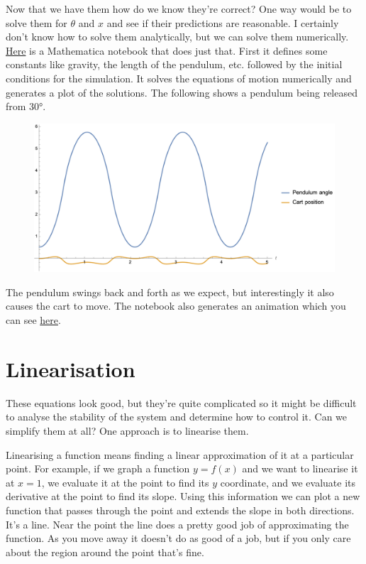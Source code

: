 \documentclass{article}
\begin{document}
Now that we have them how do we know they're correct? One way would be to solve them for $\theta$ and $x$ and see if their predictions are reasonable. I certainly don't know how to solve them analytically, but we can solve them numerically. \href{https://github.com/chrisdoble/self-balancing-inverted-pendulum/blob/master/notebooks/uncontrolled.nb}{Here} is a Mathematica notebook that does just that. First it defines some constants like gravity, the length of the pendulum, etc. followed by the initial conditions for the simulation. It solves the equations of motion numerically and generates a plot of the solutions. The following shows a pendulum being released from $\ang{30}$.

\begin{figure}[H]
  \centering
  \includegraphics[width=\textwidth]{uncontrolled}
\end{figure}

The pendulum swings back and forth as we expect, but interestingly it also causes the cart to move. The notebook also generates an animation which you can see \href{https://github.com/chrisdoble/self-balancing-inverted-pendulum/blob/master/post/images/uncontrolled.gif}{here}.

\section{Linearisation}

These equations look good, but they're quite complicated so it might be difficult to analyse the stability of the system and determine how to control it. Can we simplify them at all? One approach is to linearise them.

Linearising a function means finding a linear approximation of it at a particular point. For example, if we graph a function $y = f(x)$ and we want to linearise it at $x = 1$, we evaluate it at the point to find its $y$ coordinate, and we evaluate its derivative at the point to find its slope. Using this information we can plot a new function that passes through the point and extends the slope in both directions. It's a line. Near the point the line does a pretty good job of approximating the function. As you move away it doesn't do as good of a job, but if you only care about the region around the point that's fine.
\end{document}
